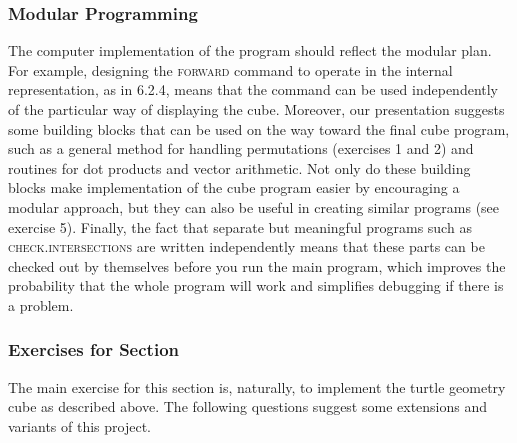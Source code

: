 \documentclass{book}
\begin{document}
\subsubsection{Modular Programming}

The computer implementation of the program should reflect the modular
plan. For example, designing the \textsc{forward} command to operate in the
internal representation, as in 6.2.4, means that the command can be used
independently of the particular way of displaying the cube. Moreover,
our presentation suggests some building blocks that can be used on
the way toward the final cube program, such as a general method for
handling permutations (exercises 1 and 2) and routines for dot products
and vector arithmetic. Not only do these building blocks make implementation of the cube program easier by encouraging a modular approach, but they can also be useful in creating similar programs (see
exercise 5). Finally, the fact that separate but meaningful programs
such as \textsc{check}\textsc{.intersections} are written independently means that
these parts can be checked out by themselves before you run the main
program, which improves the probability that the whole program will
work and simplifies debugging if there is a problem.

\subsubsection{Exercises for Section \thesection}

The main exercise for this section is, naturally, to implement the turtle
geometry cube as described above. The following questions suggest some
extensions and variants of this project.
\end{document}
